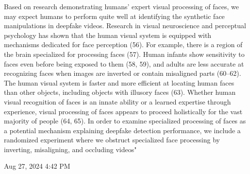 

Based on research demonstrating humans’ expert visual processing of faces, we may expect humans to perform quite well at
identifying the synthetic face manipulations in deepfake videos.
Research in visual neuroscience and perceptual psychology has
shown that the human visual system is equipped with mechanisms
dedicated for face perception (56). For example, there is a region
of the brain specialized for processing faces (57). Human infants
show sensitivity to faces even before being exposed to them (58,
59), and adults are less accurate at recognizing faces when images
are inverted or contain misaligned parts (60–62). The human
visual system is faster and more efficient at locating human faces
than other objects, including objects with illusory faces (63).
Whether human visual recognition of faces is an innate ability
or a learned expertise through experience, visual processing of
faces appears to proceed holistically for the vast majority of
people (64, 65). In order to examine specialized processing of
faces as a potential mechanism explaining deepfake detection
performance, we include a randomized experiment where we
obstruct specialized face processing by inverting, misaligning,
and occluding videos"

Aug 27, 2024 4:42 PM


